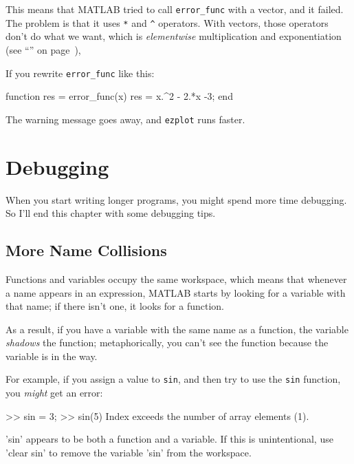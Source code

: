 This means that MATLAB tried to call \verb"error_func" with a vector, and it failed. 
The problem is that it uses \verb"*" and \verb"^" operators.  With vectors, those operators don't do what we want, which is {\em elementwise} multiplication and exponentiation
(see ``'' on page~\pageref{elementwise}),


If you rewrite \verb"error_func" like this:

\begin{code}
function res = error_func(x)
    res = x.^2 - 2.*x -3;
end
\end{code}

The warning message goes away, and {\tt ezplot} runs faster.


\section{Debugging}

When you start writing longer programs, you might spend more time debugging.  So I'll end this chapter with some debugging tips.

\subsection{More Name Collisions}

Functions and variables occupy the same workspace, which means
that whenever a name appears in an expression, MATLAB starts by looking
for a variable with that name; if there isn't one, it looks for
a function.


As a result, if you have a variable with the same name as a function,
the variable {\em shadows} the function; metaphorically, you can't see the function because the variable is in the way.  

For example, if you assign
a value to {\tt sin}, and then try to use the {\tt sin} function, you
{\em might} get an error:

\begin{code}
>> sin = 3;
>> sin(5)
Index exceeds the number of array elements (1).

'sin' appears to be both a function and a variable.
If this is unintentional, use 'clear sin' to remove 
the variable 'sin' from the workspace.
\end{code}

